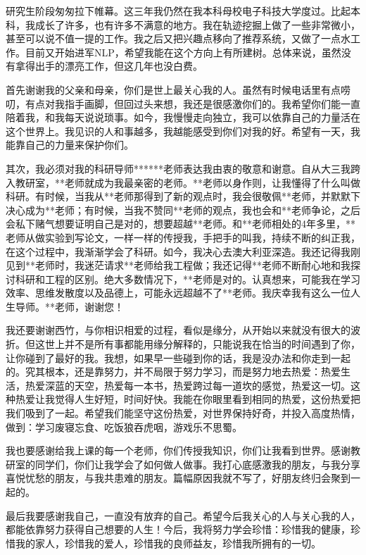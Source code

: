 

\indent
研究生阶段匆匆拉下帷幕。这三年我仍然在我本科母校电子科技大学度过。比起本科，我成长了许多，也有许多不满意的地方。我在轨迹挖掘上做了一些非常微小，甚至可以说不值一提的工作。我之后又把兴趣点移向了推荐系统，又做了一点水工作。目前又开始进军NLP，希望我能在这个方向上有所建树。总体来说，虽然没有拿得出手的漂亮工作，但这几年也没白费。

首先谢谢我的父亲和母亲，你们是世上最关心我的人。虽然有时候电话里有点唠叨，有点对我指手画脚，但回过头来想，我还是很感激你们的。我希望你们能一直陪着我，和我每天说说琐事。如今，我慢慢走向独立，我可以依靠自己的力量活在这个世界上。我见识的人和事越多，我越能感受到你们对我的好。希望有一天，我能靠自己的力量来保护你们。

其次，我必须对我的科研导师******老师表达我由衷的敬意和谢意。自从大三我跨入教研室，**老师就成为我最亲密的老师。**老师以身作则，让我懂得了什么叫做科研。有时候，当我从**老师那得到了新的观点时，我会很敬佩**老师，并默默下决心成为**老师；有时候，当我不赞同**老师的观点，我也会和**老师争论，之后会私下赌气想要证明自己是对的，想要超越**老师。和**老师相处的4年多里，**老师从做实验到写论文，一样一样的传授我，手把手的叫我，持续不断的纠正我，在这个过程中，我渐渐学会了科研。如今，我决心去澳大利亚深造。我还记得我刚见到**老师时，我迷茫请求**老师给我工程做；我还记得**老师不断耐心地和我探讨科研和工程的区别。绝大多数情况下，**老师是对的。认真想来，可能我在学习效率、思维发散度以及品德上，可能永远超越不了**老师。我庆幸我有这么一位人生导师。**老师，谢谢您！

我还要谢谢西竹，与你相识相爱的过程，看似是缘分，从开始以来就没有很大的波折。但这世上并不是所有事都能用缘分解释的，只能说我在恰当的时间遇到了你，让你碰到了最好的我。我想，如果早一些碰到你的话，我是没办法和你走到一起的。究其根本，还是靠努力，并不局限于努力学习，而是努力地去热爱：热爱生活，热爱深蓝的天空，热爱每一本书，热爱跨过每一道坎的感觉，热爱这一切。这种热爱让我觉得人生好短，时间好快。我能在你眼里看到相同的热爱，这份热爱把我们吸到了一起。希望我们能坚守这份热爱，对世界保持好奇，并投入高度热情，做到：学习废寝忘食、吃饭狼吞虎咽，游戏乐不思蜀。

我也要感谢给我上课的每一个老师，你们传授我知识，你们让我看到世界。感谢教研室的同学们，你们让我学会了如何做人做事。我打心底感激我的朋友，与我分享喜悦忧愁的朋友，与我共患难的朋友。篇幅原因我就不写了，好朋友终归会聚到一起的。

最后我要感谢我自己，一直没有放弃的自己。希望今后我关心的人与关心我的人，都能依靠努力获得自己想要的人生！今后，我将努力学会珍惜：珍惜我的健康，珍惜我的家人，珍惜我的爱人，珍惜我的良师益友，珍惜我所拥有的一切。


